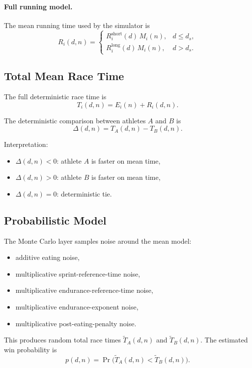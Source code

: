 \documentclass[11pt]{article}
\begin{document}
\paragraph{Full running model.}
The mean running time used by the simulator is
\[
R_i(d,n) =
\begin{cases}
R_i^{\text{short}}(d) \, M_i(n), & d \leq d_s, \\
R_i^{\text{long}}(d) \, M_i(n), & d > d_s.
\end{cases}
\]

\subsection*{Total Mean Race Time}

The full deterministic race time is
\[
T_i(d,n) = E_i(n) + R_i(d,n).
\]

The deterministic comparison between athletes $A$ and $B$ is
\[
\Delta(d,n) = T_A(d,n) - T_B(d,n).
\]

Interpretation:
\begin{itemize}
    \item $\Delta(d,n) < 0$: athlete $A$ is faster on mean time,
    \item $\Delta(d,n) > 0$: athlete $B$ is faster on mean time,
    \item $\Delta(d,n) = 0$: deterministic tie.
\end{itemize}

\subsection*{Probabilistic Model}

The Monte Carlo layer samples noise around the mean model:
\begin{itemize}
    \item additive eating noise,
    \item multiplicative sprint-reference-time noise,
    \item multiplicative endurance-reference-time noise,
    \item multiplicative endurance-exponent noise,
    \item multiplicative post-eating-penalty noise.
\end{itemize}

This produces random total race times $\widetilde{T}_A(d,n)$ and $\widetilde{T}_B(d,n)$.
The estimated win probability is
\[
p(d,n) = \Pr\!\bigl(\widetilde{T}_A(d,n) < \widetilde{T}_B(d,n)\bigr).
\]
\end{document}
